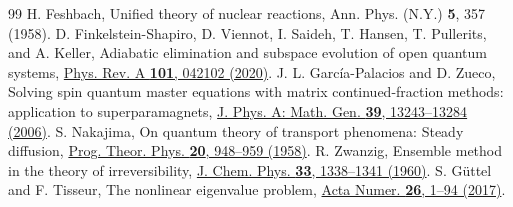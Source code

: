 \documentclass[aps,pra,twocolumn,superscriptaddress,amsmath,amssymb,reprint,floatfix]{revtex4-2}
\begin{document}
\begin{thebibliography}{99}
 H. Feshbach, Unified theory of nuclear reactions, Ann. Phys. (N.Y.) \textbf{5}, 357 (1958).
 D. Finkelstein-Shapiro, D. Viennot, I. Saideh, T. Hansen, T. Pullerits, and A. Keller, Adiabatic elimination and subspace evolution of open quantum systems, \href{https://doi.org/10.1103/PhysRevA.101.042102}{Phys. Rev. A \textbf{101}, 042102 (2020)}.
 J. L. Garc\'ia-Palacios and D. Zueco, Solving spin quantum master equations with matrix continued-fraction methods: application to superparamagnets, \href{https://doi.org/10.1088/0305-4470/39/42/005}{J. Phys. A: Math. Gen. \textbf{39}, 13243--13284 (2006)}.
 S. Nakajima, On quantum theory of transport phenomena: Steady diffusion, \href{https://doi.org/10.1143/PTP.20.948}{Prog. Theor. Phys. \textbf{20}, 948--959 (1958)}.
 R. Zwanzig, Ensemble method in the theory of irreversibility, \href{https://doi.org/10.1063/1.1731409}{J. Chem. Phys. \textbf{33}, 1338--1341 (1960)}.
 S. G\"uttel and F. Tisseur, The nonlinear eigenvalue problem, \href{https://doi.org/10.1017/S0962492917000034}{Acta Numer. \textbf{26}, 1--94 (2017)}.
\end{thebibliography}
\end{document}
